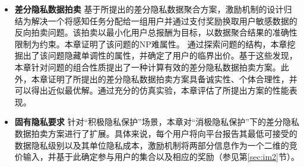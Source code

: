 \begin{itemize}
		\item {\kaishu\bfseries 差分隐私数据拍卖} 
		基于所提出的差分隐私数据聚合方案，激励机制的设计归结为解决一个将感知任务分配给一组用户并通过支付奖励换取用户敏感数据的反向拍卖问题。该拍卖以最小化用户总报酬为目标，以数据聚合结果的准确性限制为约束。本章证明了该问题的NP难属性。
		通过探索问题的结构，本章挖掘出了该问题{\kaishu 隐藏单调性}的属性，并确定了用户的临界出价。基于这些发现，本章针对问题的组合性质提出了一种计算有效的差分隐私数据拍卖方案。此外，本章证明了所提出的差分隐私数据拍卖方案具备诚实性、个体合理性，并可以得出近似最优解。通过充分的仿真实验，本章评估了所提出方案的性能表现。
		
		\item {\bfseries 固有隐私要求}
		针对“积极隐私保护”场景，本章对“消极隐私保护”下的差分隐私数据拍卖方案进行了扩展。具体来说，每个用户将向平台报告其最低可接受的数据隐私级别以及其单位隐私成本，激励机制将两部分信息作为一个二维的竞价输入，并基于此确定参与用户的集合以及相应的奖励（参见第\ref{sec:im2}节）。
	\end{itemize}
	


	
	
